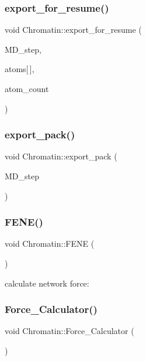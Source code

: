 \subsubsection{\texorpdfstring{export\_for\_resume()}{export\_for\_resume()}\hspace{0.1cm}{\footnotesize\ttfamily [2/2]}}
{\footnotesize\ttfamily void Chromatin\+::export\+\_\+for\+\_\+resume (\begin{DoxyParamCaption}\item[{int}]{M\+D\+\_\+step,  }\item[{\mbox{\hyperlink{structMyAtomInfo}{My\+Atom\+Info}}}]{atoms\mbox{[}$\,$\mbox{]},  }\item[{int}]{atom\+\_\+count }\end{DoxyParamCaption})}

\mbox{\label{classChromatin_a73cbccc73e3676425082c8c233919ee0}} 
\subsubsection{\texorpdfstring{export\_pack()}{export\_pack()}}
{\footnotesize\ttfamily void Chromatin\+::export\+\_\+pack (\begin{DoxyParamCaption}\item[{int}]{M\+D\+\_\+step }\end{DoxyParamCaption})}

\mbox{\label{classChromatin_a22b0a397c521e9775a0fedc027aaf709}} 
\subsubsection{\texorpdfstring{FENE()}{FENE()}}
{\footnotesize\ttfamily void Chromatin\+::\+F\+E\+NE (\begin{DoxyParamCaption}\item[{void}]{ }\end{DoxyParamCaption})}

calculate network force\+: \mbox{\label{classChromatin_a37cf6dcb2eca02312739e4b14e48c2b9}} 
\subsubsection{\texorpdfstring{Force\_Calculator()}{Force\_Calculator()}}
{\footnotesize\ttfamily void Chromatin\+::\+Force\+\_\+\+Calculator (\begin{DoxyParamCaption}\item[{void}]{ }\end{DoxyParamCaption})}

